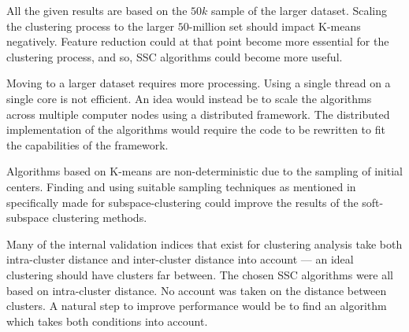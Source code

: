 \documentclass[../report.tex]{subfiles}
\begin{document}
All the given results are based on the $50k$ sample of the larger dataset. Scaling the clustering process to the larger $50$-million set should impact K-means negatively. Feature reduction could at that point become more essential for the clustering process, and so, SSC algorithms could become more useful.

Moving to a larger dataset requires more processing. Using a single thread on a single core is not efficient. An idea would instead be to scale the algorithms across multiple computer nodes using a distributed framework. The distributed implementation of the algorithms would require the code to be rewritten to fit the capabilities of the framework.

Algorithms based on K-means are non-deterministic due to the sampling of initial centers. Finding and using suitable sampling techniques as mentioned in \cite{Gan2016} specifically made for subspace-clustering could improve the results of the soft-subspace clustering methods.

Many of the internal validation indices that exist for clustering analysis take both intra-cluster distance and inter-cluster distance into account --- an ideal clustering should have clusters far between. The chosen SSC algorithms were all based on intra-cluster distance. No account was taken on the distance between clusters. A natural step to improve performance would be to find an algorithm which takes both conditions into account.
\end{document}
